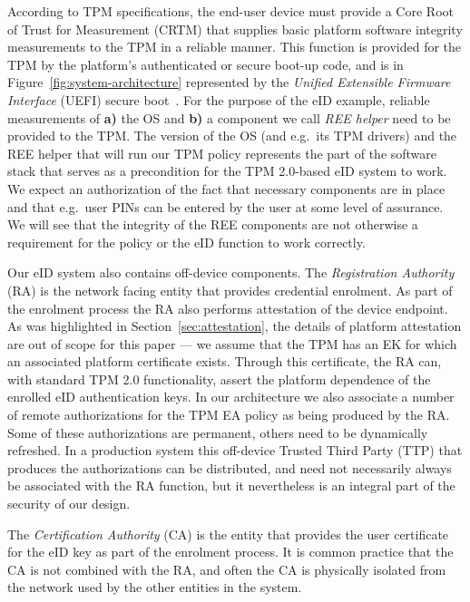 \documentclass{sig-alternate-2013}
\begin{document}
According to TPM specifications, the end-user device must provide a Core Root of
Trust for Measurement (CRTM) that supplies basic platform software integrity
measurements to the TPM in a reliable manner. This function is provided for the
TPM by the platform's authenticated or secure boot-up code, and is in
Figure~\ref{fig:system-architecture} represented by the \emph{Unified Extensible
Firmware Interface} (UEFI) secure boot~\cite{Wilkins13}. For the purpose of the
eID example, reliable measurements of \textbf{a)} the OS and \textbf{b)} a
component we call \emph{REE helper} need to be provided to the TPM\@. The
version of the OS (and e.g.\ its TPM drivers) and the REE helper that will
run our TPM policy represents the part of the software stack that serves as a
precondition for the TPM 2.0-based eID system to work. We expect an
authorization of the fact that necessary components are in place and that e.g.\
user PINs can be entered by the user at some level of assurance. We will see
that the integrity of the REE components are not otherwise a requirement
for the policy or the eID function to work correctly.

Our eID system also contains off-device components. The \emph{Registration
Authority} (RA) is the network facing entity that provides credential enrolment.
As part of the enrolment process the RA also performs attestation of the device
endpoint. As was highlighted in Section~\ref{sec:attestation}, the details of
platform attestation are out of scope for this paper --- we assume that the TPM
has an EK for which an associated platform certificate exists.  Through this
certificate, the RA can, with standard TPM 2.0 functionality, assert the
platform dependence of the enrolled eID authentication keys. In our architecture
we also associate a number of remote authorizations for the TPM EA policy as
being produced by the RA\@. Some of these authorizations are permanent, others
need to be dynamically refreshed. In a production system this off-device Trusted
Third Party (TTP) that produces the authorizations can be distributed, and need
not necessarily always be associated with the RA function, but it nevertheless
is an integral part of the security of our design.

The \emph{Certification Authority} (CA) is the entity that provides the user
certificate for the eID key as part of the enrolment process. It is common
practice that the CA is not combined with the RA, and often the CA is physically
isolated from the network used by the other entities in the system.
\end{document}

